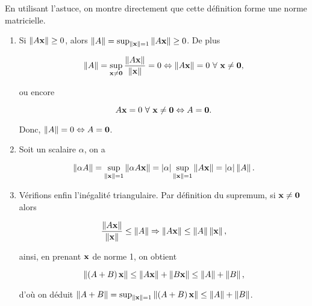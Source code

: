 En utilisant l'astuce, on montre directement que cette définition forme une norme matricielle.

\begin{enumerate}[label=\alph*)]
  \item Si $\left\lVert A \mathbf{x}\right\rVert \geq 0$, alors $\left\lVert A\right\rVert = \sup_{\left\lVert\mathbf{x}\right\rVert = 1} \left\lVert A \mathbf{x}\right\rVert \geq 0$. De plus
  
  \begin{equation*}
    \left\lVert A\right\rVert = \sup_{\mathbf{x} \neq \mathbf{0}} \dfrac{\left\lVert A \mathbf{x}\right\rVert}{\left\lVert\mathbf{x}\right\rVert} = 0
    \Leftrightarrow
    \left\lVert A \mathbf{x}\right\rVert = 0 \ \forall \ \mathbf{x} \neq \mathbf{0},
  \end{equation*}
  
  ou encore
  
  \begin{equation*}
    A \mathbf{x} = 0 \ \forall \ \mathbf{x} \neq \mathbf{0}
    \Leftrightarrow
    A = \mathbf{0}.
  \end{equation*}
  
  Donc, $\left\lVert A\right\rVert = 0 \Leftrightarrow A = \mathbf{0}$.
  
  \item Soit un scalaire $\alpha$, on a 
  
  \begin{equation*}
    \left\lVert\alpha A\right\rVert
    = \sup_{\left\lVert\mathbf{x}\right\rVert = 1} \left\lVert\alpha A \mathbf{x}\right\rVert
    = \left\lvert\alpha\right\rvert \sup_{\left\lVert\mathbf{x}\right\rVert = 1} \left\lVert A \mathbf{x}\right\rVert
    = \left\lvert\alpha\right\rvert \left\lVert A\right\rVert.
  \end{equation*}
  
  \item Vérifions enfin l'inégalité triangulaire. Par définition du supremum, si $\mathbf{x} \neq \mathbf{0}$ alors
  
  \begin{equation*}
    \dfrac{\left\lVert A \mathbf{x}\right\rVert}{\left\lVert\mathbf{x}\right\rVert} \leq \left\lVert A\right\rVert
    \Rightarrow \left\lVert A \mathbf{x}\right\rVert \leq \left\lVert A\right\rVert \left\lVert\mathbf{x}\right\rVert,
  \end{equation*}
  
  ainsi, en prenant $\mathbf{x}$ de norme 1, on obtient
  
  \begin{equation*}
    \left\lVert\left(A + B\right) \mathbf{x}\right\rVert
    \leq \left\lVert A \mathbf{x}\right\rVert + \left\lVert B \mathbf{x}\right\rVert
    \leq \left\lVert A\right\rVert + \left\lVert B\right\rVert, 
  \end{equation*}
  
  d'où on déduit $\left\lVert A + B\right\rVert = \sup_{\left\lVert\mathbf{x}\right\rVert = 1} \left\lVert\left(A + B\right) \mathbf{x}\right\rVert \leq \left\lVert A\right\rVert + \left\lVert B\right\rVert$.
  
  
  
\end{enumerate}



